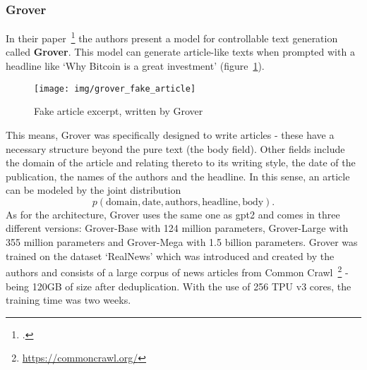 \subsubsection{Grover}
\label{sub:grover}

In their paper~\footcite{zellers2019neuralfakenews} the authors present a model for controllable text generation called \textbf{Grover}. This model can generate article-like texts when prompted with a headline like `Why Bitcoin is a great investment' (figure~\ref{fig:grover}).

\begin{figure}[h]
  	\texttt{[image: img/grover\_fake\_article]}
  	\caption{Fake article excerpt, written by Grover}
	\label{fig:grover}
\end{figure}

This means, Grover was specifically designed to write articles - these have a necessary structure beyond the pure text (the body field). Other fields include the domain of the article and relating thereto to its writing style, the date of the publication, the names of the authors and the headline. In this sense, an article can be modeled by the joint distribution
\begin{equation}
	p(\text{domain}, \text{date}, \text{authors}, \text{headline}, \text{body}).
\end{equation}
As for the architecture, Grover uses the same one as \gls{gpt2} and comes in three different versions: Grover-Base with 124 million parameters, Grover-Large with 355 million parameters and Grover-Mega with 1.5 billion parameters. Grover was trained on the dataset `RealNews' which was introduced and created by the authors and consists of a large corpus of news articles from Common Crawl~\footnote{\url{https://commoncrawl.org/}} - being 120GB of size after deduplication. With the use of 256 TPU v3 cores, the training time was two weeks. \\
